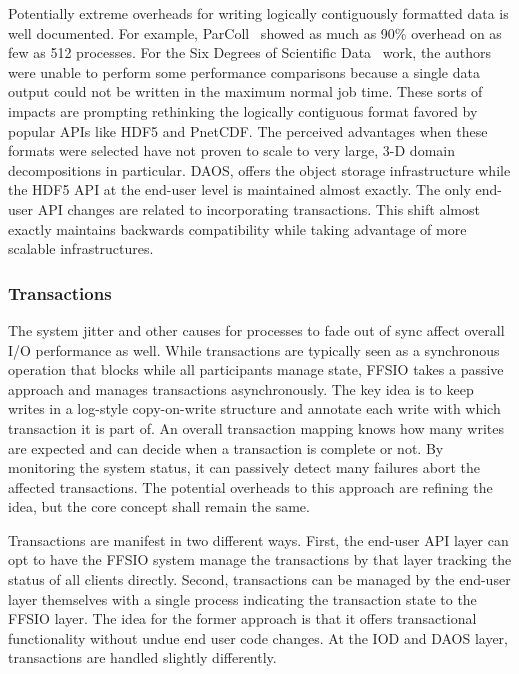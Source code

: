 Potentially extreme overheads for writing logically contiguously formatted data
is well documented. For example, ParColl~\cite{yu:2006:parcoll} showed as much
as 90\% overhead on as few as 512 processes. For the Six Degrees of Scientific
Data~\cite{lofstead:2011:six-degrees} work, the authors were unable to perform
some performance comparisons because a single data output could not be written
in the maximum normal job time. These sorts of impacts are prompting rethinking
the logically contiguous format favored by popular APIs like HDF5 and PnetCDF.
The perceived advantages when these formats were selected have not proven to
scale to very large, 3-D domain decompositions in particular. DAOS, offers the
object storage infrastructure while the HDF5 API at the end-user level is
maintained almost exactly. The only end-user API changes are related to
incorporating transactions. This shift almost exactly maintains backwards
compatibility while taking advantage of more scalable infrastructures.

\subsubsection{Transactions}
The system jitter and other causes for processes to fade out of sync affect
overall I/O performance as well. While transactions are typically seen as a
synchronous operation that blocks while all participants manage state, FFSIO
takes a passive approach and manages transactions asynchronously. The key idea
is to keep writes in a log-style copy-on-write structure and annotate each
write with which transaction it is part of. An overall transaction mapping
knows how many writes are expected and can decide when a transaction is
complete or not. By monitoring the system status, it can passively detect many
failures abort the affected transactions. The potential overheads to this
approach are refining the idea, but the core concept shall remain the same.

Transactions are manifest in two different ways. First, the end-user API layer
can opt to have the FFSIO system manage the transactions by that layer
tracking the status of all clients directly. Second, transactions can be
managed by the end-user layer themselves with a single process indicating the
transaction state to the FFSIO layer. The idea for the former approach is that
it offers transactional functionality without undue end user code changes. At
the IOD and DAOS layer, transactions are handled slightly differently.

